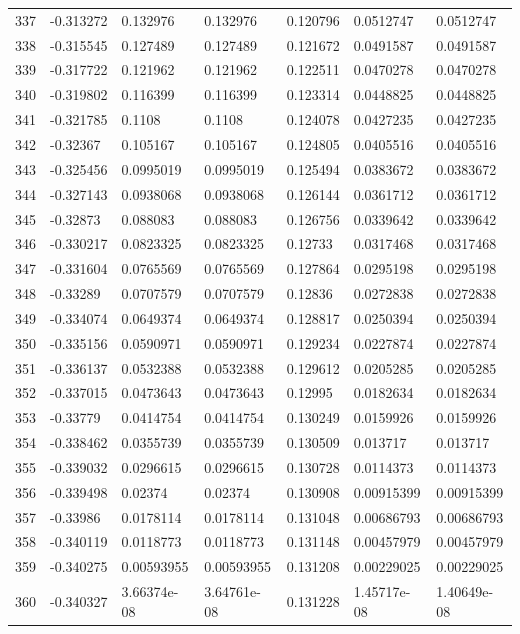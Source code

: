 \begin{longtable}{l|lll|lll}
 337 & -0.313272    & 0.132976    & 0.132976    &  0.120796    & 0.0512747   & 0.0512747   \\
 338 & -0.315545    & 0.127489    & 0.127489    &  0.121672    & 0.0491587   & 0.0491587   \\
 339 & -0.317722    & 0.121962    & 0.121962    &  0.122511    & 0.0470278   & 0.0470278   \\
 340 & -0.319802    & 0.116399    & 0.116399    &  0.123314    & 0.0448825   & 0.0448825   \\
 341 & -0.321785    & 0.1108      & 0.1108      &  0.124078    & 0.0427235   & 0.0427235   \\
 342 & -0.32367     & 0.105167    & 0.105167    &  0.124805    & 0.0405516   & 0.0405516   \\
 343 & -0.325456    & 0.0995019   & 0.0995019   &  0.125494    & 0.0383672   & 0.0383672   \\
 344 & -0.327143    & 0.0938068   & 0.0938068   &  0.126144    & 0.0361712   & 0.0361712   \\
 345 & -0.32873     & 0.088083    & 0.088083    &  0.126756    & 0.0339642   & 0.0339642   \\
 346 & -0.330217    & 0.0823325   & 0.0823325   &  0.12733     & 0.0317468   & 0.0317468   \\
 347 & -0.331604    & 0.0765569   & 0.0765569   &  0.127864    & 0.0295198   & 0.0295198   \\
 348 & -0.33289     & 0.0707579   & 0.0707579   &  0.12836     & 0.0272838   & 0.0272838   \\
 349 & -0.334074    & 0.0649374   & 0.0649374   &  0.128817    & 0.0250394   & 0.0250394   \\
 350 & -0.335156    & 0.0590971   & 0.0590971   &  0.129234    & 0.0227874   & 0.0227874   \\
 351 & -0.336137    & 0.0532388   & 0.0532388   &  0.129612    & 0.0205285   & 0.0205285   \\
 352 & -0.337015    & 0.0473643   & 0.0473643   &  0.12995     & 0.0182634   & 0.0182634   \\
 353 & -0.33779     & 0.0414754   & 0.0414754   &  0.130249    & 0.0159926   & 0.0159926   \\
 354 & -0.338462    & 0.0355739   & 0.0355739   &  0.130509    & 0.013717    & 0.013717    \\
 355 & -0.339032    & 0.0296615   & 0.0296615   &  0.130728    & 0.0114373   & 0.0114373   \\
 356 & -0.339498    & 0.02374     & 0.02374     &  0.130908    & 0.00915399  & 0.00915399  \\
 357 & -0.33986     & 0.0178114   & 0.0178114   &  0.131048    & 0.00686793  & 0.00686793  \\
 358 & -0.340119    & 0.0118773   & 0.0118773   &  0.131148    & 0.00457979  & 0.00457979  \\
 359 & -0.340275    & 0.00593955  & 0.00593955  &  0.131208    & 0.00229025  & 0.00229025  \\
 360 & -0.340327    & 3.66374e-08 & 3.64761e-08 &  0.131228    & 1.45717e-08 & 1.40649e-08 \\
\hline
\end{longtable}

